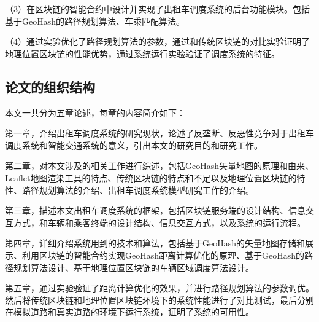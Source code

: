 （3）在区块链的智能合约中设计并实现了出租车调度系统的后台功能模块。包括基于GeoHash的路径规划算法、车乘匹配算法。

（4）通过实验优化了路径规划算法的参数，通过和传统区块链的对比实验证明了地理位置区块链的性能优势，通过系统运行实验验证了调度系统的特征。

\subsection{论文的组织结构}
本文一共分为五章论述，每章的内容简介如下：

第一章，介绍出租车调度系统的研究现状，论述了反垄断、反恶性竞争对于出租车调度系统和智能交通系统的意义，引出本文的研究目的和研究工作。

第二章，对本文涉及的相关工作进行综述，包括GeoHash矢量地图的原理和由来、Leaflet地图渲染工具的特点、传统区块链的特点和不足以及地理位置区块链的特性、路径规划算法的介绍、出租车调度系统模型研究工作的介绍。

第三章，描述本文出租车调度系统的框架，包括区块链服务端的设计结构、信息交互方式，和车辆和乘客终端的设计结构、信息交互方式，以及系统的运行流程。

第四章，详细介绍系统用到的技术和算法，包括基于GeoHash的矢量地图存储和展示、利用区块链的智能合约实现GeoHash距离计算优化的原理、基于GeoHash的路径规划算法设计、基于地理位置区块链的车辆区域调度算法设计。

第五章，通过实验验证了距离计算优化的效果，并进行路径规划算法的参数调优。然后将传统区块链和地理位置区块链环境下的系统性能进行了对比测试，最后分别在模拟道路和真实道路的环境下运行系统，证明了系统的可用性。